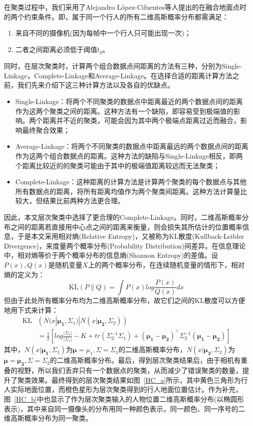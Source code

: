 在聚类过程中，我们采用了Alejandro López-Cifuentes\cite{A2018Semantic}等人提出的在融合地面点时的两个约束条件。即，属于同一个行人的所有二维高斯概率分布都需满足：
\begin{enumerate}
    \item 来自不同的摄像机(因为每帧中一个行人只可能出现一次)；
    \item 二者之间距离必须低于阈值$t_{g}$。
\end{enumerate}
同时，在层次聚类时，计算两个组合数据点间距离的方法有三种，分别为Single-Linkage，Complete-Linkage和Average-Linkage。在选择合适的距离计算方法之前，我们先来介绍下这三种计算方法以及各自的优缺点。
\begin{itemize}
    \item Single-Linkage：将两个不同聚类的数据点中距离最近的两个数据点间的距离作为这两个聚类之间的距离。这种方法有一个缺陷，即容易受到极端值的影响。两个距离并不近的聚类，可能会因为其中两个极端点距离过近而融合，影响最终聚合效果；
    \item Average-Linkage：将两个不同聚类的数据点中距离最远的两个数据点间的距离作为这两个组合数据点的距离。这种方法的缺陷与Single-Linkage相反，即两个距离比较近的的聚类可能由于其中的极端值距离较远而无法聚类；
    \item Complete-Linkage：这种距离的计算方法是计算两个聚类的每个数据点与其他所有数据点的距离，将所有距离均值作为两个聚类间距离。这种方法计算量比较大，但结果比前两种方法更合理。
\end{itemize}
因此，本文层次聚类中选择了更合理的Complete-Linkage。同时，二维高斯概率分布之间的距离若直接用中心点之间的距离来衡量，则会损失其所估计的位置概率信息，于是本文采用相对熵(Relative Entropy)，又被称为KL散度(Kullback-Leibler Divergence)，来度量两个概率分布(Probability Distribution)间差异。在信息理论中，相对熵等价于两个概率分布的信息熵(Shannon Entropy)的差值。设$P(x), Q(x)$是随机变量$X$上的两个概率分布，在连续随机变量的情形下，相对熵的定义为：
$$
\text{KL}(P\|Q)=\int P(x)log{\frac{P(x)}{Q(x)}}dx
$$
但由于此处所有概率分布均为二维高斯概率分布，故它们之间的KL散度可以方便地用下式来计算：
$$
\begin{aligned}
\text{KL}&\left(N(x|\bm{\mu_1},\Sigma_1)|N(x|\bm{\mu_2},\Sigma_2)\right) \\
&=\frac{1}{2}\left[log{\frac{|\Sigma_2|}{|\Sigma_1|}}-K+tr(\Sigma_2^{-1}\Sigma_1)+(\bm{\mu_1}-\bm{\mu_2})^\top\Sigma_2^{-1}(\bm{\mu_1}-\bm{\mu_2})\right]
\end{aligned}
$$
其中，$N(x|\bm{\mu_1},\Sigma_1)$为$\bm{\mu}=\mu_1, \Sigma=\Sigma_1$的二维高斯概率分布，$N(x|\bm{\bm{\mu_2}},\Sigma_2)$为$\bm{\mu}=\bm{\mu_2}, \Sigma=\Sigma_2$的二维高斯概率分布。最后，得到层次聚类结果后，由于相机有重叠的视野，所以我们丢弃只有一个数据点的聚类，从而减少了错误聚类的数量，提升了聚类效果。最终得到的层次聚类结果如图~\ref{HC_a}所示，其中黄色三角形为行人实际地面位置，而橙色星形为层次聚类得到的行人地面位置估计。作为补充，图~\ref{HC_b}中也显示了作为层次聚类输入的人物位置二维高斯概率分布(以椭圆形表示)，其中来自同一摄像头的分布用同一种颜色表示，同一颜色、同一序号的二维高斯概率分布为同一聚类。
